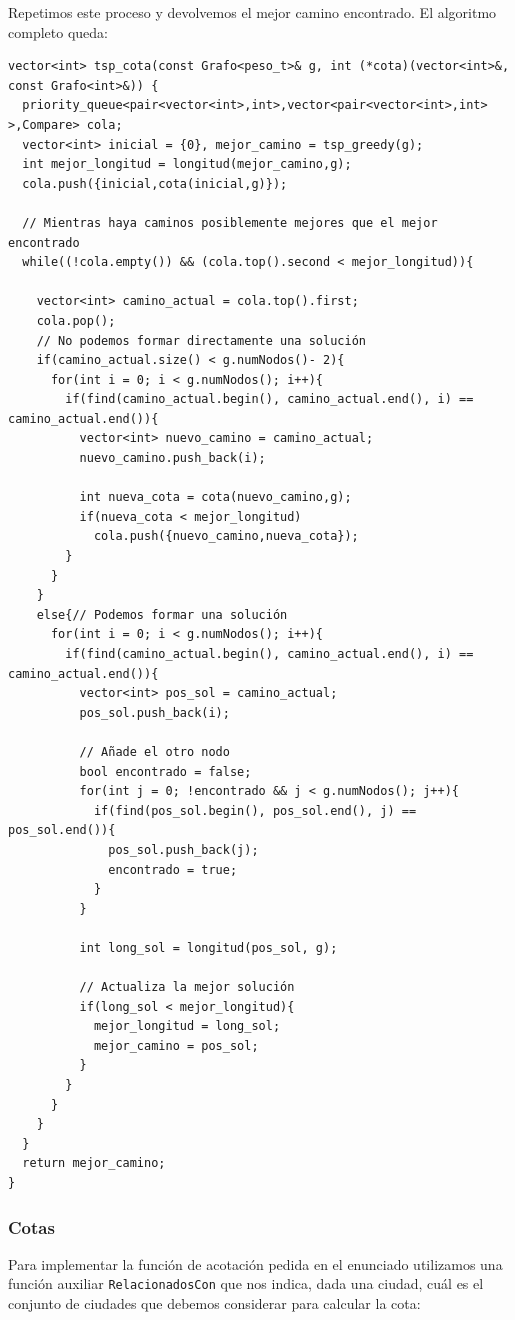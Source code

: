 Repetimos este proceso y devolvemos el mejor camino encontrado. El algoritmo completo queda:

\begin{lstlisting}
vector<int> tsp_cota(const Grafo<peso_t>& g, int (*cota)(vector<int>&, const Grafo<int>&)) {
  priority_queue<pair<vector<int>,int>,vector<pair<vector<int>,int> >,Compare> cola;
  vector<int> inicial = {0}, mejor_camino = tsp_greedy(g);
  int mejor_longitud = longitud(mejor_camino,g);
  cola.push({inicial,cota(inicial,g)});

  // Mientras haya caminos posiblemente mejores que el mejor encontrado
  while((!cola.empty()) && (cola.top().second < mejor_longitud)){

    vector<int> camino_actual = cola.top().first;
    cola.pop();
    // No podemos formar directamente una solución
    if(camino_actual.size() < g.numNodos()- 2){
      for(int i = 0; i < g.numNodos(); i++){
        if(find(camino_actual.begin(), camino_actual.end(), i) == camino_actual.end()){
          vector<int> nuevo_camino = camino_actual;
          nuevo_camino.push_back(i);

          int nueva_cota = cota(nuevo_camino,g);
          if(nueva_cota < mejor_longitud)
            cola.push({nuevo_camino,nueva_cota});
        }
      }
    }
    else{// Podemos formar una solución
      for(int i = 0; i < g.numNodos(); i++){
        if(find(camino_actual.begin(), camino_actual.end(), i) == camino_actual.end()){
          vector<int> pos_sol = camino_actual;
          pos_sol.push_back(i);

          // Añade el otro nodo
          bool encontrado = false;
          for(int j = 0; !encontrado && j < g.numNodos(); j++){
            if(find(pos_sol.begin(), pos_sol.end(), j) == pos_sol.end()){
              pos_sol.push_back(j);
              encontrado = true;
            }
          }

          int long_sol = longitud(pos_sol, g);

          // Actualiza la mejor solución
          if(long_sol < mejor_longitud){
            mejor_longitud = long_sol;
            mejor_camino = pos_sol;
          }
        }
      }
    }
  }
  return mejor_camino;
}
\end{lstlisting}

\subsubsection{Cotas}

Para implementar la función de acotación pedida en el enunciado utilizamos una función auxiliar \texttt{RelacionadosCon} que nos indica, dada una ciudad, cuál es el conjunto de ciudades que debemos considerar para calcular la cota:

